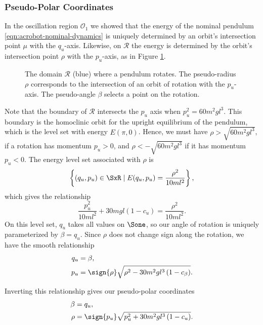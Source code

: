 \subsubsection*{Pseudo-Polar Coordinates}

In the oscillation region \(\mathcal{O}_1\) we showed that the energy of the
nominal pendulum \eqref{eqn:acrobot-nominal-dynamics} is uniquely determined by
an orbit's intersection point \(\mu\) with the \(q_u\)-axis.
Likewise, on \(\mathcal{R}\) the energy is determined by the orbit's intersection
point \(\rho\) with the \(p_u\)-axis, as in Figure \ref{fig:rho-intersection}.

\begin{figure}
    \centering
    
    \caption{The domain \(\mathcal{R}\) (blue) where a pendulum rotates. The
        pseudo-radius \(\rho\) corresponds to the intersection of an orbit of
        rotation with the \(p_u\)-axis. The pseudo-angle \(\beta\) selects a
        point on the rotation.}
    \label{fig:rho-intersection}
\end{figure}

Note that the boundary of \(\mathcal{R}\) intersects the \(p_u\) axis when 
\(p_u^2 = 60m^2 g l^3\). 
This boundary is the homoclinic orbit for the
upright equilibrium of the pendulum, which is the level set with energy
\(E(\pi,0)\).
Hence, we must have \(\rho > \sqrt{60 m^2 g l^3}\), if a
rotation has momentum \(p_u > 0\), 
and \(\rho < -\sqrt{60 m^2 g l^3}\) if it has momentum \(p_u < 0\).
The energy level set associated with \(\rho\) is 
\[
    \left\{(q_u,p_u) \in \SxR \mid E(q_u,p_u) = \frac{\rho^2}{10ml^2}\right\}
    ,
\]
which gives the relationship
\begin{equation}\label{eqn:rotation-pu2}
    \frac{p_u^2}{10m l^2} + 30mgl(1 - c_u) = \frac{\rho^2}{10 ml^2}
    .
\end{equation}
On this level set, \(q_u\) takes all values on \(\Sone\), so our angle of
rotation is uniquely parameterized by \(\beta = q_u\).
Since \(\rho\) does not change sign along the rotation, we have the smooth
relationship
\begin{align}\label{eqn:rotation-Tinv}
    q_u &= \beta
    , \\
    p_u &= \sign{\rho}\sqrt{\rho^2 - 30 m^2 g l^3\left(1 - c_\beta \right)}
    .
\end{align}

Inverting this relationship gives our pseudo-polar coordinates
\begin{align}\label{eqn:rotation-T}
    \beta &= q_u
    , \\
    \rho &= \sign{p_u}\sqrt{p_u^2 + 30 m^2 g l^3 \left(1 - c_u \right)}
    .
\end{align}

